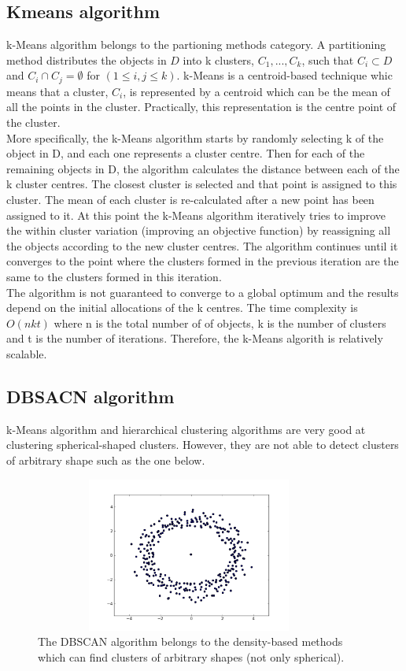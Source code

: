 \subsection{Kmeans algorithm}
k-Means algorithm belongs to the partioning methods category. A partitioning method distributes the objects in $D$  into k clusters, $C_1, ..., C_k$, such that $C_i \subset D$ and $C_i \cap C_j = \emptyset$ for $(1 \leq i, j \leq k)$. k-Means is a centroid-based technique whic means that a cluster, $C_i$, is represented by a centroid which can be the mean of all the points in the cluster. Practically, this representation is the centre point of the cluster. \\
More specifically, the k-Means algorithm starts by randomly selecting k of the object in D, and each one represents a cluster centre. Then for each of the remaining objects in D, the algorithm calculates the distance between each of the k cluster centres. The closest cluster is selected and that point is assigned to this cluster. The mean of each cluster is re-calculated after a new point has been assigned to it. At this point the k-Means algorithm iteratively tries to improve the within cluster variation (improving an objective function) by reassigning all the objects according to the new cluster centres. The algorithm continues until it converges to the point where the clusters formed in the previous iteration are the same to the clusters formed in this iteration.\\ 
The algorithm is not guaranteed to converge to a global optimum and the results depend on the initial allocations of the k centres. The time complexity is $O(nkt)$ where n is the total number of of objects, k is the number of clusters and t is the number of iterations. Therefore, the k-Means algorith is relatively scalable. 

\subsection{DBSACN algorithm}
k-Means algorithm and hierarchical clustering algorithms are very good at clustering spherical-shaped clusters. However, they are not able to detect clusters of arbitrary shape such as the one below.  \

\begin{figure}[!htbp]
  \begin{center}
    \includegraphics[height=2in, width=4in]{dbscan-example}
    \caption{The DBSCAN algorithm belongs to the density-based methods which can find clusters of arbitrary shapes (not only spherical).}
    \label{DBSCANExample}
  \end{center}
\end{figure} 

